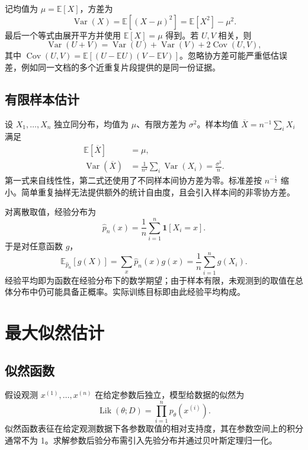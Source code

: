 \documentclass[../textbook.tex]{subfiles}
\begin{document}
记均值为 $\mu=\mathbb E[X]$，方差为
\begin{equation}
 \operatorname{Var}(X)=\mathbb E[(X-\mu)^2]=\mathbb E[X^2]-\mu^2.
\end{equation}
最后一个等式由展开平方并使用 $\mathbb E[X]=\mu$ 得到。若 $U,V$ 相关，则
\begin{equation}
 \operatorname{Var}(U+V)=\operatorname{Var}(U)+\operatorname{Var}(V)
 +2\operatorname{Cov}(U,V),
\end{equation}
其中 $\operatorname{Cov}(U,V)=\mathbb E[(U-\mathbb E U)(V-\mathbb E V)]$。忽略协方差可能严重低估误差，例如同一文档的多个近重复片段提供的是同一份证据。

\subsection{有限样本估计}
设 $X_1,\ldots,X_n$ 独立同分布，均值为 $\mu$、有限方差为 $\sigma^2$。样本均值 $\overline X=n^{-1}\sum_iX_i$ 满足
\begin{equation}
\begin{aligned}
 \mathbb E[\overline X] &= \mu, \\
 \operatorname{Var}(\overline X) &= \frac1{n^2}\sum_i\operatorname{Var}(X_i)=\frac{\sigma^2}{n}.
\end{aligned}
\end{equation}
第一式来自线性性，第二式还使用了不同样本间协方差为零。标准差按 $n^{-\frac{1}{2}}$ 缩小。简单重复抽样无法提供额外的统计自由度，且会引入样本间的非零协方差。

对离散取值，经验分布为
\begin{equation}
 \widehat p_n(x)=\frac1n\sum_{i=1}^n\mathbf1[X_i=x].
\end{equation}
于是对任意函数 $g$，
\begin{equation}
 \mathbb E_{\widehat p_n}[g(X)]=\sum_x\widehat p_n(x)g(x)
 =\frac1n\sum_{i=1}^n g(X_i).
\end{equation}
经验平均即为函数在经验分布下的数学期望；由于样本有限，未观测到的取值在总体分布中仍可能具备正概率。实际训练目标即由此经验平均构成。

\section{最大似然估计}

\subsection{似然函数}
假设观测 $x^{(1)},\ldots,x^{(n)}$ 在给定参数后独立，模型给数据的似然为
\begin{equation}
 \operatorname{Lik}(\theta;D)=\prod_{i=1}^n p_\theta(x^{(i)}).
\end{equation}
似然函数表征在给定观测数据下各参数取值的相对支持度，其在参数空间上的积分通常不为 1。求解参数后验分布需引入先验分布并通过贝叶斯定理归一化。
\end{document}
